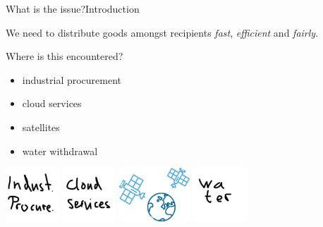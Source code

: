 \begin{frame}{What is the issue?}{Introduction}
	\adjustfortopblock
	\begin{block}{}
		We need to distribute goods amongst recipients \emph{fast}, \emph{efficient} and \emph{fairly}.
	\end{block}

	Where is this encountered?
	\begin{itemize}
		\item
		industrial procurement

		\item
		cloud services

		\item
		satellites

		\item
		water withdrawal
	\end{itemize}

	\begin{center}
		\includegraphics[height=2cm]{img/industrialprocurement}
		\hfil
		\includegraphics[height=2cm]{img/cloudservices}
		\hfil
		\includegraphics[height=2cm]{img/satellites}
		\hfil
		\includegraphics[height=2cm]{img/water}
	\end{center}
\end{frame}